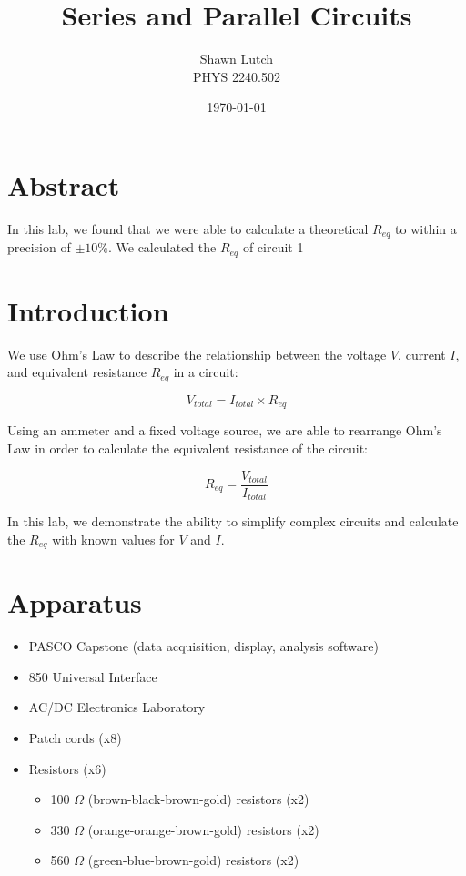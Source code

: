 \documentclass[12pt,letterpaper,titlepage]{report}
\newcommand{\myTitle}{Series and Parallel Circuits}
\newcommand{\myName}{Shawn Lutch}
\newcommand{\myPeriod}{PHYS 2240.502}
\begin{document}


\title{\myTitle{}}
\author{\myName{}\\ \myPeriod{}}
\date{\today}
\maketitle




\section*{Abstract}

In this lab, we found that we were able to calculate a theoretical $R_{eq}$ to within a precision of $\pm 10\%$. We calculated the $R_{eq}$ of circuit 1 



\bigskip
\section*{Introduction}

We use Ohm's Law to describe the relationship between the voltage $V$, current $I$, and equivalent resistance $R_{eq}$ in a circuit:

$$V_{total} = I_{total} \times R_{eq}$$

Using an ammeter and a fixed voltage source, we are able to rearrange Ohm's Law in order to calculate the equivalent resistance of the circuit:

$$R_{eq} = \frac{ V_{total} }{ I_{total} }$$

In this lab, we demonstrate the ability to simplify complex circuits and calculate the $R_{eq}$ with known values for $V$ and $I$.





\bigskip
\section*{Apparatus}

\begin{itemize}
	\item PASCO Capstone (data acquisition, display, analysis software)
	\item 850 Universal Interface
	\item AC/DC Electronics Laboratory
	\item Patch cords (x8)
	\item Resistors (x6)
		\begin{itemize}
			\item 100 $\Omega$ (brown-black-brown-gold) resistors (x2)
			\item 330 $\Omega$ (orange-orange-brown-gold) resistors (x2)
			\item 560 $\Omega$ (green-blue-brown-gold) resistors (x2)
		\end{itemize}
\end{itemize}
\end{document}
